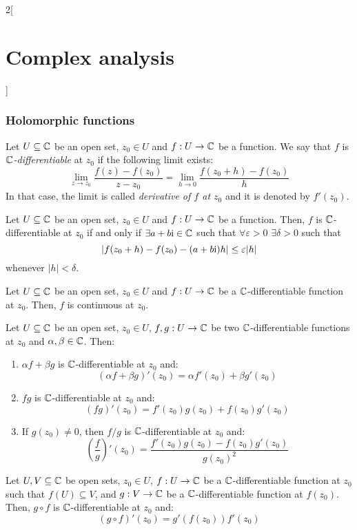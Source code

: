 \documentclass[../../../main.tex]{subfiles}
\begin{document}
\begin{multicols}{2}[\section{Complex analysis}]
  \subsubsection{Holomorphic functions}
  \begin{definition}
    Let $U\subseteq \mathbb{C}$ be an open set, $z_0\in U$ and $f:U\rightarrow \mathbb{C}$ be a function. We say that $f$ is \emph{$\mathbb{C}$-differentiable} at $z_0$ if the following limit exists: $$\lim_{z \to z_0} \frac{f(z) - f(z_0)}{z - z_0} = \lim_{h \to 0} \frac{f(z_0 + h) - f(z_0)}{h}$$ In that case, the limit is called \textit{derivative of $f$ at $z_0$} and it is denoted by $f'(z_0)$.
  \end{definition}
  \begin{proposition}
    Let $U\subseteq \mathbb{C}$ be an open set, $z_0\in U$ and $f:U\rightarrow \mathbb{C}$ be a function. Then, $f$ is $\mathbb{C}$-differentiable at $z_0$ if and only if $\exists a+b\mathrm{i}\in\mathbb{C}$ such that $\forall\varepsilon>0$ $\exists\delta>0$ such that $$|f(z_0+h)-f(z_0)-(a+b\mathrm{i})h|\leq \varepsilon \abs{h}$$ whenever $|h|<\delta$.
  \end{proposition}
  \begin{proposition}
    Let $U\subseteq \mathbb{C}$ be an open set, $z_0 \in U$ and $f:U\rightarrow \mathbb{C}$ be a $\mathbb{C}$-differentiable function at $z_0$. Then, $f$ is continuous at $z_0$.
  \end{proposition}
  \begin{proposition}
    Let $U\subseteq \mathbb{C}$ be an open set, $z_0 \in U$, $f,g:U\rightarrow \mathbb{C}$ be two $\mathbb{C}$-differentiable functions at $z_0$ and $\alpha,\beta\in \mathbb{C}$. Then:
    \begin{enumerate}
      \item $\alpha f + \beta g$ is $\mathbb{C}$-differentiable at $z_0$ and: $${(\alpha f+ \beta g)}'(z_0) = \alpha f'(z_0) + \beta g'(z_0)$$
      \item $fg$ is $\mathbb{C}$-differentiable at $z_0$ and: $${(fg)}'(z_0) = f'(z_0)g(z_0) + f(z_0)g'(z_0)$$
      \item If $g(z_0) \neq 0$, then $f/g$ is $\mathbb{C}$-differentiable at $z_0$ and:
            $${\left(\frac{f}{g}\right)}'(z_0) = \frac{f'(z_0)g(z_0) - f(z_0) g'(z_0)}{{g(z_0)}^2}$$
    \end{enumerate}
  \end{proposition}
  \begin{theorem}
    Let $U,V\subseteq \mathbb{C}$ be open sets, $z_0\in U$, $f:U\rightarrow\mathbb{C}$ be a $\mathbb{C}$-differentiable function at $z_0$ such that $f(U)\subseteq V$, and $g:V\rightarrow\mathbb{C}$ be a $\mathbb{C}$-differentiable function at $f(z_0)$. Then, $g\circ f$ is $\mathbb{C}$-differentiable at $z_0$ and: $${(g\circ f)}'(z_0)=g'(f(z_0))f'(z_0)$$

\end{theorem}
\end{multicols}
\end{document}
